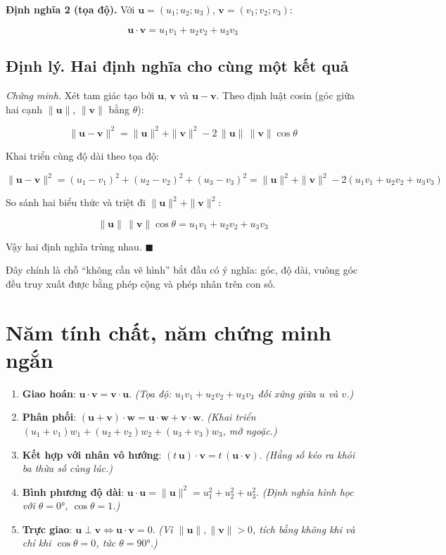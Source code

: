 \documentclass[12pt,a4paper]{article}
\begin{document}
\textbf{Định nghĩa 2 (tọa độ).} Với $\mathbf{u} = (u_1;u_2;u_3)$, $\mathbf{v} = (v_1;v_2;v_3)$:

$$
\mathbf{u} \cdot \mathbf{v} = u_1 v_1 + u_2 v_2 + u_3 v_3
$$

\subsection*{Định lý. Hai định nghĩa cho cùng một kết quả}

\emph{Chứng minh.} Xét tam giác tạo bởi $\mathbf{u}$, $\mathbf{v}$ và $\mathbf{u}-\mathbf{v}$. Theo định luật cosin (góc giữa hai cạnh $\|\mathbf{u}\|$, $\|\mathbf{v}\|$ bằng $\theta$):

$$
\|\mathbf{u}-\mathbf{v}\|^2 = \|\mathbf{u}\|^2 + \|\mathbf{v}\|^2 - 2\,\|\mathbf{u}\|\,\|\mathbf{v}\|\cos\theta
$$

Khai triển cùng độ dài theo tọa độ:

$$
\|\mathbf{u}-\mathbf{v}\|^2 = (u_1{-}v_1)^2 + (u_2{-}v_2)^2 + (u_3{-}v_3)^2
= \|\mathbf{u}\|^2 + \|\mathbf{v}\|^2 - 2(u_1v_1+u_2v_2+u_3v_3)
$$

So sánh hai biểu thức và triệt đi $\|\mathbf{u}\|^2 + \|\mathbf{v}\|^2$:

$$
\|\mathbf{u}\|\,\|\mathbf{v}\|\cos\theta = u_1v_1 + u_2v_2 + u_3v_3
$$

Vậy hai định nghĩa trùng nhau. $\blacksquare$

Đây chính là chỗ ``không cần vẽ hình'' bắt đầu có ý nghĩa: góc, độ dài, vuông góc đều truy xuất được bằng phép cộng và phép nhân trên con số.

\section{Năm tính chất, năm chứng minh ngắn}

\begin{enumerate}
  \item \textbf{Giao hoán}: $\mathbf{u}\cdot\mathbf{v} = \mathbf{v}\cdot\mathbf{u}$.
        \emph{(Tọa độ: $u_1v_1+u_2v_2+u_3v_3$ đối xứng giữa $u$ và $v$.)}
  \item \textbf{Phân phối}: $(\mathbf{u}+\mathbf{v})\cdot\mathbf{w} = \mathbf{u}\cdot\mathbf{w} + \mathbf{v}\cdot\mathbf{w}$.
        \emph{(Khai triển $(u_1{+}v_1)w_1 + (u_2{+}v_2)w_2 + (u_3{+}v_3)w_3$, mở ngoặc.)}
  \item \textbf{Kết hợp với nhân vô hướng}: $(t\,\mathbf{u})\cdot\mathbf{v} = t\,(\mathbf{u}\cdot\mathbf{v})$.
        \emph{(Hằng số kéo ra khỏi ba thừa số cùng lúc.)}
  \item \textbf{Bình phương độ dài}: $\mathbf{u}\cdot\mathbf{u} = \|\mathbf{u}\|^2 = u_1^2+u_2^2+u_3^2$.
        \emph{(Định nghĩa hình học với $\theta = 0°$, $\cos\theta = 1$.)}
  \item \textbf{Trực giao}: $\mathbf{u} \perp \mathbf{v} \Leftrightarrow \mathbf{u}\cdot\mathbf{v} = 0$.
        \emph{(Vì $\|\mathbf{u}\|, \|\mathbf{v}\| > 0$, tích bằng không khi và chỉ khi $\cos\theta = 0$, tức $\theta = 90°$.)}
\end{enumerate}
\end{document}
